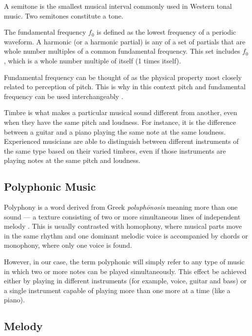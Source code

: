A semitone is the smallest musical interval commonly used in Western tonal music. Two semitones constitute a tone.

The fundamental frequency $f_{\text{0}}$ is defined as the lowest frequency of a periodic waveform. A harmonic (or a harmonic partial) is any of a set of partials that are whole number multiples of a common fundamental frequency. This set includes $f_{0}$, which is a whole number multiple of itself (1 times itself).

Fundamental frequency can be thought of as the physical property most closely related to perception of pitch. This is why in this context pitch and fundamental frequency can be used interchangeably \cite{salamon}.

Timbre is what makes a particular musical sound different from another, even when they have the same pitch and loudness. For instance, it is the difference between a guitar and a piano playing the same note at the same loudness. Experienced musicians are able to distinguish between different instruments of the same type based on their varied timbres, even if those instruments are playing notes at the same pitch and loudness.

\vspace{10pt}

\subsection{Polyphonic Music}

Polyphony is a word derived from Greek \textit{poluph\={o}nosis} meaning more than one sound — a texture consisting of two or more simultaneous lines of independent melody \cite{polyphonic}. This is usually contrasted with homophony, where musical parts move in the same rhythm and one dominant melodic voice is accompanied by chords or monophony, where only one voice is found. 

However, in our case, the term polyphonic will simply refer to any type of music in which two or more notes can be played simultaneously. This effect be achieved either by playing in different instruments (for example, voice, guitar and bass) or a single instrument capable of playing more than one more at a time (like a piano).

\vspace{10pt}

\subsection{Melody}

